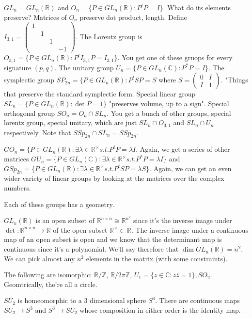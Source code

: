 \documentclass{article}
\newcommand{\C}{\mathbb{C}}
\newcommand{\R}{\mathbb{R}}
\newcommand{\Z}{\mathbb{Z}}
\newcommand{\ra}[1][]{\xrightarrow{#1}}
\begin{document}
\begin{example}
$GL_n=GL_n(\R)$ and $O_n=\{P\in GL_n(\R):P^tP=I\}$. What do its elements preserve? Matrices of $O_n$ preserve dot product, length. Define $I_{3,1}=\begin{pmatrix}1&&&\\&1&&\\&&1&\\&&&-1\end{pmatrix}$. The Lorentz group is $O_{3,1}=\{P\in GL_n(\R):P^tI_{3,1}P=I_{3,1}\}.$ You get one of these gruops for every signature $(p,q)$. The unitary group $U_n=\{P\in GL_n(\C):P^*P=I\}$. The symplectic group $SP_{2n}=\{P\in GL_n(\R):P^tSP=S$ where $S=\begin{pmatrix}0&I\\I&1\end{pmatrix}$. "Things that preserve the standard symplectic form. Special linear group $SL_n=\{P\in GL_n(\R): \det P=1\}$ "preserves volume, up to a sign". Special orthogonal group $SO_n=O_n\cap SL_n$. You get a bunch of other groups, special lorentz group, special unitary, which are just $SL_n\cap O_{3,1}$ and $SL_n\cap U_n$ respectively. Note that $SSp_{2n}\cap SL_n=SSp_{2n}$.
\end{example}
\begin{example}
$GO_n=\{P\in GL_n(\R):\exists \lambda\in \R^\times s.t. P^tP=\lambda I$. Again, we get a series of other matrices $GU_n=\{P\in GL_n(\C):\exists \lambda\in \R^\times s.t. P^*P=\lambda I\}$ and $GSp_{2n}=\{P\in GL_n(\R):\exists \lambda\in\R^\times s.t. P^tSP=\lambda S\}$. Again, we can get an even wider variety of linear groups by looking at the matrices over the complex numbers.
\end{example}

Each of these groups has a geometry.
\begin{example}
$GL_n(\R)$ is an open subset of $\R^{n\times n}\cong \R^{n^2}$ since it's the inverse image under $\det:\R^{n\times n}\ra\R$ of the open subset $\R^\times \subset \R$. The inverse image under a continuous map of an open subset is open and we know that the determinant map is continuous since it's a polynomial. We'll say therefore that $\dim GL_n(\R)=n^2$. We can pick almost any $n^2$ elements in the matrix (with some constraints).
\end{example}
\begin{example}
The following are isomorphic: $\R/\Z$, $\R/2\pi\Z$, $U_1=\{z\in\C:z\overline{z}=1\},SO_2$. Geomtrically, the're all a circle.
\end{example}
\begin{example}
$SU_2$ is homeomorphic to a 3 dimensional sphere $S^3$. There are continuous maps $SU_2\ra S^3$ and $S^3\ra SU_2$ whose composition in either order is the identity map.
\end{example}
\end{document}
